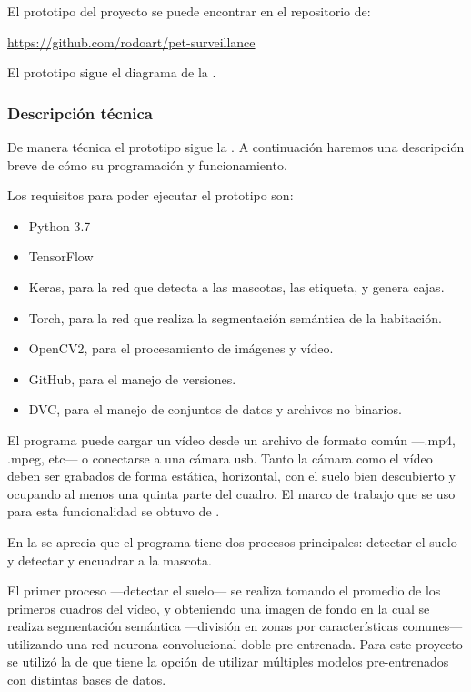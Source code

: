 El prototipo del proyecto se puede encontrar en el repositorio de:

\begin{quotebox}
    \href{https://github.com/rodoart/pet-surveillance}{https://github.com/rodoart/pet-surveillance}
\end{quotebox}    

El prototipo sigue el diagrama de la . 

\subsubsection{Descripción técnica}

De manera técnica el prototipo sigue la  . A continuación haremos una descripción breve de cómo su programación y funcionamiento.

Los requisitos para poder ejecutar el prototipo son:

\begin{itemize}
    \item Python 3.7
    \item TensorFlow
    \item Keras, para la red que detecta a las mascotas, las etiqueta, y genera cajas.
    \item Torch, para la red que realiza la segmentación semántica de la habitación.
    \item OpenCV2, para el procesamiento de imágenes y vídeo.
    \item GitHub, para el manejo de versiones.
    \item DVC, para el manejo de conjuntos de datos y archivos no binarios.
\end{itemize}

El programa puede cargar un vídeo desde un archivo de formato común —.mp4, .mpeg, etc— o conectarse a una cámara usb. Tanto la cámara como el vídeo deben ser grabados de forma estática, horizontal, con el suelo bien descubierto y ocupando al menos una quinta parte del cuadro. El marco de trabajo que se uso para esta funcionalidad se obtuvo de \textcite{juras2018}.

En la  se aprecia que el programa tiene dos procesos principales: detectar el suelo y detectar y encuadrar a la mascota. 

El primer proceso —detectar el suelo— se realiza tomando el promedio de los primeros cuadros del vídeo, y obteniendo una imagen de fondo en la cual se realiza segmentación semántica —división en zonas por características comunes— utilizando una red neurona convolucional doble pre-entrenada. Para este proyecto se utilizó la de \textcite{aung2022} que tiene la opción de utilizar múltiples modelos pre-entrenados con distintas bases de datos.

